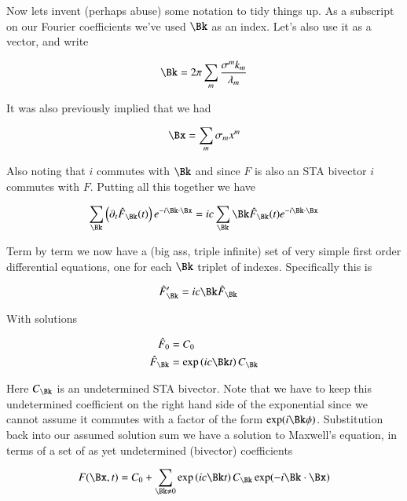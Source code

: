 \documentclass{article}
\begin{document}
Now lets invent (perhaps abuse) some notation to tidy things up.  As a subscript on our Fourier coefficients we've used $\Bk$ as an index.  Let's also use it as a vector, and write

\begin{align*}
\Bk = 2 \pi \sum_m \frac{\sigma^m k_m}{\lambda_m}
\end{align*}

It was also previously implied that we had

\begin{align*}
\Bx = \sum_m \sigma_m x^m
\end{align*}

Also noting that $i$ commutes with $\Bk$ and since $F$ is also an STA bivector $i$ commutes with $F$.  Putting all this together we have

\begin{align*}
\sum_{\Bk} \left(\partial_t \hat{F}_{\Bk}(t) \right) e^{-i \Bk \cdot \Bx }
&= i c \sum_{\Bk} \Bk \hat{F}_{\Bk}(t) e^{- i \Bk \cdot \Bx } \\
\end{align*}

Term by term we now have a (big ass, triple infinite) set of very simple first order differential equations, one for each $\Bk$ triplet of indexes.  Specifically this is

\begin{align*}
\hat{F}_{\Bk}' &= i c \Bk \hat{F}_{\Bk}
\end{align*}

With solutions

\begin{align*}
\hat{F}_{0} &= C_{0} \\
\hat{F}_{\Bk} &= \exp\left(i c \Bk t \right) C_{\Bk} \\
\end{align*}

Here $C_{\Bk}$ is an undetermined STA bivector.  Note that we have to keep this undetermined coefficient on the right hand side of the exponential since we cannot assume it commutes with a factor of the form $\exp(i\Bk\phi)$.  Substitution back into our assumed solution sum we have a solution to Maxwell's equation, in terms of a set of as yet undetermined (bivector) coefficients

\begin{align}\label{eqn:undetermined}
F(\Bx,t) = C_0 + \sum_{\Bk \ne 0} \exp\left(i c \Bk t \right) C_{\Bk} \exp(-i \Bk \cdot \Bx )
\end{align}
\end{document}
